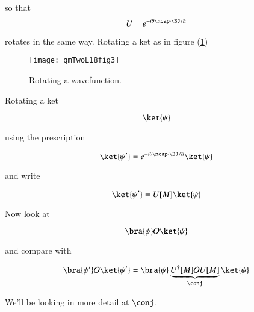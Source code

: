 so that
\begin{equation}\label{eqn:qmTwoL18:450}
U = e^{-i \theta \ncap \cdot \BJ/\hbar}
\end{equation}

rotates in the same way.  Rotating a ket as in figure (\ref{fig:qmTwoL18:qmTwoL18fig3})
\begin{figure}[htp]
   \centering
   \texttt{[image: qmTwoL18fig3]}
   \caption{Rotating a wavefunction.}\label{fig:qmTwoL18:qmTwoL18fig3}
\end{figure}

Rotating a ket

\begin{equation}\label{eqn:qmTwoL18:470}
\ket{\psi}
\end{equation}

using the prescription

\begin{equation}\label{eqn:qmTwoL18:490}
\ket{\psi'} = e^{-i \theta \ncap \cdot \BJ/\hbar} \ket{\psi}
\end{equation}

and write

\begin{equation}\label{eqn:qmTwoL18:510}
\ket{\psi'} = U[M] \ket{\psi}
\end{equation}

Now look at 

\begin{equation}\label{eqn:qmTwoL18:530}
\bra{\psi} \mathcal{O} \ket{\psi}
\end{equation}

and compare with

\begin{equation}\label{eqn:qmTwoL18:550}
\bra{\psi'} \mathcal{O} \ket{\psi'}
=
\bra{\psi} \underbrace{U^\dagger[M] \mathcal{O} U[M]}_{\conj} \ket{\psi}
\end{equation}

We'll be looking in more detail at $\conj$.

\EndArticle
